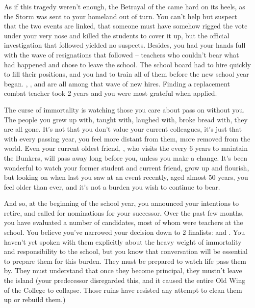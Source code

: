 \documentclass[char]{GL2020}
\begin{document}
As if this tragedy weren't enough, the Betrayal of the \pShip{} came hard on its heels, as the Storm was sent to your homeland out of turn. You can't help but suspect that the two events are linked, that someone must have somehow rigged the vote under your very nose and killed the students to cover it up, but the official investigation that followed yielded no suspects. Besides, you had your hands full with the wave of resignations that followed -- teachers who couldn't bear what had happened and chose to leave the school. The school board had to hire quickly to fill their positions, and you had to train all of them before the new school year began. \cPrince{\full}, \cChupInventor{\full}, and \cChupSecond{\full} are all among that wave of new hires. Finding a replacement combat teacher took 2 years and you were most grateful when \cInterpol{\full} applied.

The curse of immortality is watching those you care about pass on without you. The people you grew up with, taught with, laughed with, broke bread with, they are all gone. It's not that you don't value your current colleagues, it's just that with every passing year, you feel more distant from them, more removed from the world. Even your current oldest friend, \cBunker{\full}, who visits the \pSc{} every 6 years to maintain the Bunkers, will pass away long before you, unless you make a change.  It's been wonderful to watch your former student and current friend, \cDiplomat{\full} grow up and flourish, but looking on \cDiplomat{\them} when last you saw \cDiplomat{\them} at an event recently, aged almost 50 years, you feel older than ever, and it's not a burden you wish to continue to bear.

And so, at the beginning of the school year, you announced your intentions to retire, and called for nominations for your successor. Over the past few months, you have evaluated a number of candidates, most of whom were teachers at the school. You believe you've narrowed your decision down to 2 finalists: \cMusic{\full} and \cBeetle{\full}. You haven't yet spoken with them explicitly about the heavy weight of immortality and responsibility to the school, but you know that conversation will be essential to prepare them for this burden. They must be prepared to watch life pass them by. They must understand that once they become principal, they mustn't leave the island (your predecessor disregarded this, and it caused the entire Old Wing of the College to collapse. Those ruins have resisted any attempt to clean them up or rebuild them.)
\end{document}
